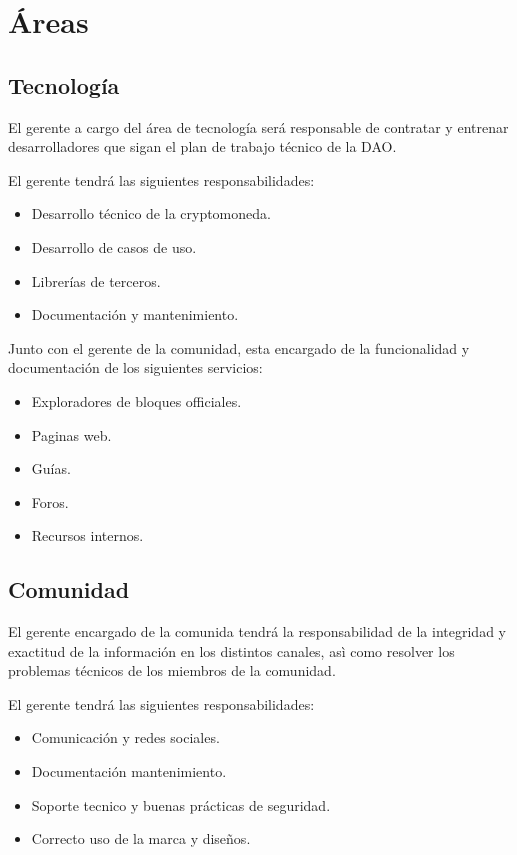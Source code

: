 \documentclass{article}
\begin{document}
\section{Áreas}

\subsection{Tecnología}

El gerente a cargo del área de tecnología será responsable de contratar y entrenar desarrolladores que sigan el plan de trabajo técnico de la DAO.

El gerente tendrá las siguientes responsabilidades:

\begin{itemize}
  \item Desarrollo técnico de la cryptomoneda.
  \item Desarrollo de casos de uso.
  \item Librerías de terceros.
  \item Documentación y mantenimiento.
\end{itemize}

Junto con el gerente de la comunidad, esta encargado de la funcionalidad y documentación de los siguientes servicios:

\begin{itemize}
  \item Exploradores de bloques officiales.
  \item Paginas web.
  \item Guías.
  \item Foros.
  \item Recursos internos.
\end{itemize}

\subsection{Comunidad}

El gerente encargado de la comunida tendrá la responsabilidad de la integridad y exactitud de la información en los distintos canales, asì como resolver los problemas técnicos de los miembros de la comunidad.

El gerente tendrá las siguientes responsabilidades:

\begin{itemize}
  \item Comunicación y redes sociales.
  \item Documentación mantenimiento.
  \item Soporte tecnico y buenas prácticas de seguridad.
  \item Correcto uso de la marca y diseños.
\end{itemize}
\end{document}
